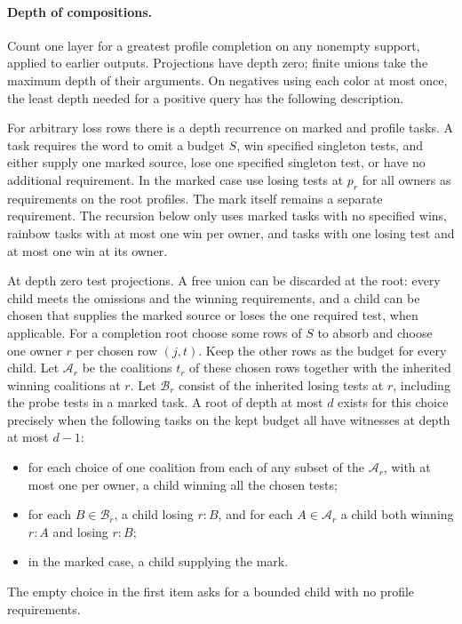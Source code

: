 

\paragraph{Depth of compositions.}
Count one layer for a greatest profile completion on any nonempty
support, applied to earlier outputs. Projections have depth zero;
finite unions take the maximum depth of their arguments. On negatives
using each color at most once, the least depth needed for a positive
query has the following description.

For arbitrary loss rows there is a depth recurrence
on marked and profile tasks. A task requires the word
to omit a budget $S$, win specified singleton tests,
and either supply one marked source, lose one specified
singleton test, or have no additional requirement.
In the marked case use losing tests at $p_r$ for all
owners as requirements on the root profiles. The mark
itself remains a separate requirement. The recursion
below only uses marked tasks with no specified wins,
rainbow tasks with at most one win per owner, and tasks
with one losing test and at most one win at its owner.

At depth zero test projections. A free union can
be discarded at the root: every child meets the
omissions and the winning requirements, and a child
can be chosen that supplies the marked source or
loses the one required test, when applicable. For a
completion root choose some rows of $S$ to absorb
and choose one owner $r$ per chosen row $(j,t)$.
Keep the other rows as the budget for every child.
Let $\mathcal A_r$ be the coalitions $t_r$ of these
chosen rows together with the inherited winning
coalitions at $r$. Let $\mathcal B_r$ consist of the
inherited losing tests at $r$, including the probe
tests in a marked task. A root of depth at most $d$
exists for this choice precisely when the following
tasks on the kept budget all have witnesses at
depth at most $d-1$:
\begin{itemize}
\item for each choice of one coalition from each of
any subset of the $\mathcal A_r$, with at most one
per owner, a child winning all the chosen tests;
\item for each $B\in\mathcal B_r$, a child losing
$r:B$, and for each $A\in\mathcal A_r$ a child both
winning $r:A$ and losing $r:B$;
\item in the marked case, a child supplying the mark.
\end{itemize}
The empty choice in the first item asks for a bounded
child with no profile requirements.

